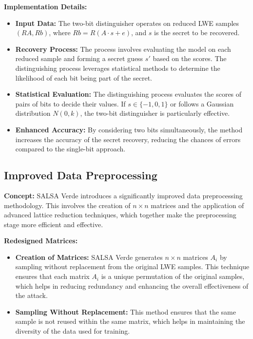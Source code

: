 \documentclass{article}
\begin{document}
\vspace{3mm}

\textbf{Implementation Details:}

\begin{itemize}
    \item \textbf{Input Data:} The two-bit distinguisher operates on reduced LWE samples $(RA, Rb)$, where $Rb = R(A \cdot s + e)$, and $s$ is the secret to be recovered.
    \item \textbf{Recovery Process:} The process involves evaluating the model on each reduced sample and forming a secret guess $s'$ based on the scores. The distinguishing process leverages statistical methods to determine the likelihood of each bit being part of the secret.
    \item \textbf{Statistical Evaluation:} The distinguishing process evaluates the scores of pairs of bits to decide their values. If $s \in \{-1, 0, 1\}$ or follows a Gaussian distribution $N(0, k)$, the two-bit distinguisher is particularly effective.
    \item \textbf{Enhanced Accuracy:} By considering two bits simultaneously, the method increases the accuracy of the secret recovery, reducing the chances of errors compared to the single-bit approach.
\end{itemize}

\subsection{Improved Data Preprocessing}

\textbf{Concept:} SALSA Verde introduces a significantly improved data preprocessing methodology. This involves the creation of \( n \times n \) matrices and the application of advanced lattice reduction techniques, which together make the preprocessing stage more efficient and effective.

\vspace{3mm}

\textbf{Redesigned Matrices:}

\begin{itemize}
    \item \textbf{Creation of Matrices:} SALSA Verde generates \( n \times n \) matrices \( A_i \) by sampling without replacement from the original LWE samples. This technique ensures that each matrix \( A_i \) is a unique permutation of the original samples, which helps in reducing redundancy and enhancing the overall effectiveness of the attack.
    \item \textbf{Sampling Without Replacement:} This method ensures that the same sample is not reused within the same matrix, which helps in maintaining the diversity of the data used for training.
\end{itemize}
\end{document}
